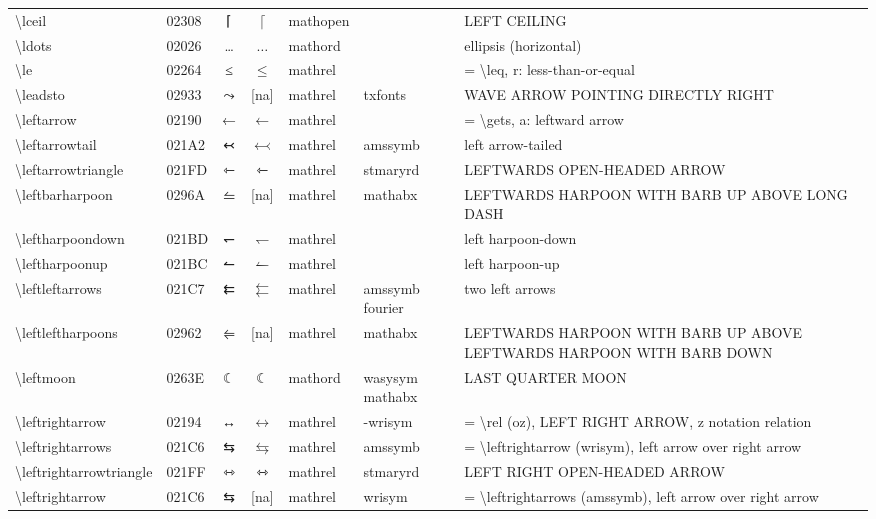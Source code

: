 \documentclass[a4paper,landscape]{article}
\begin{document}
\begin{longtable}{llcclll}
\textbackslash{}lceil & 02308 & ⌈ & $\lceil$ & mathopen &  & LEFT CEILING \\
\textbackslash{}ldots & 02026 & … & $\ldots$ & mathord &  & ellipsis (horizontal) \\
\textbackslash{}le & 02264 & ≤ & $\le$ & mathrel &  & = \textbackslash{}leq,  r: less-than-or-equal \\
\textbackslash{}leadsto & 02933 & ⤳ & [na] & mathrel & txfonts & WAVE ARROW POINTING DIRECTLY RIGHT \\
\textbackslash{}leftarrow & 02190 & ← & $\leftarrow$ & mathrel &  & = \textbackslash{}gets, a: leftward arrow \\
\textbackslash{}leftarrowtail & 021A2 & ↢ & $\leftarrowtail$ & mathrel & amssymb & left arrow-tailed \\
\textbackslash{}leftarrowtriangle & 021FD & ⇽ & $\leftarrowtriangle$ & mathrel & stmaryrd & LEFTWARDS OPEN-HEADED ARROW \\
\textbackslash{}leftbarharpoon & 0296A & ⥪ & [na] & mathrel & mathabx & LEFTWARDS HARPOON WITH BARB UP ABOVE LONG DASH \\
\textbackslash{}leftharpoondown & 021BD & ↽ & $\leftharpoondown$ & mathrel &  & left harpoon-down \\
\textbackslash{}leftharpoonup & 021BC & ↼ & $\leftharpoonup$ & mathrel &  & left harpoon-up \\
\textbackslash{}leftleftarrows & 021C7 & ⇇ & $\leftleftarrows$ & mathrel & amssymb fourier & two left arrows \\
\textbackslash{}leftleftharpoons & 02962 & ⥢ & [na] & mathrel & mathabx & LEFTWARDS HARPOON WITH BARB UP ABOVE LEFTWARDS HARPOON WITH BARB DOWN \\
\textbackslash{}leftmoon & 0263E & \textsf ☾ & $\leftmoon$ & mathord & wasysym mathabx & LAST QUARTER MOON \\
\textbackslash{}leftrightarrow & 02194 & ↔ & $\leftrightarrow$ & mathrel & -wrisym & = \textbackslash{}rel (oz), LEFT RIGHT ARROW, z notation relation \\
\textbackslash{}leftrightarrows & 021C6 & ⇆ & $\leftrightarrows$ & mathrel & amssymb & = \textbackslash{}leftrightarrow (wrisym), left arrow over right arrow \\
\textbackslash{}leftrightarrowtriangle & 021FF & ⇿ & $\leftrightarrowtriangle$ & mathrel & stmaryrd & LEFT RIGHT OPEN-HEADED ARROW \\
\textbackslash{}leftrightarrow & 021C6 & ⇆ & [na] & mathrel & wrisym & = \textbackslash{}leftrightarrows (amssymb),  left arrow over right arrow \\

\end{longtable}
\end{document}
